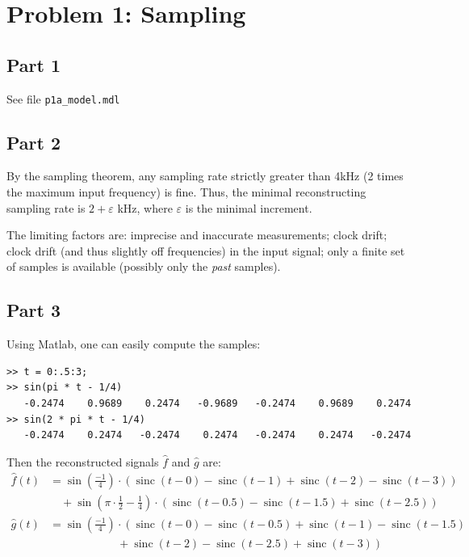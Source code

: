 \documentclass[a4paper,parskip,headheight=38pt]{scrartcl} %
\DeclareMathOperator{\sinc}{sinc}
\begin{document}
\section*{Problem 1: Sampling}

\subsection*{Part 1}

See file \texttt{p1a\_model.mdl}

\subsection*{Part 2}

By the sampling theorem, any sampling rate strictly greater than 4kHz
(2 times the maximum input frequency) is fine.  Thus, the minimal
reconstructing sampling rate is $2 + \varepsilon$ kHz, where
$\varepsilon$ is the minimal increment.

The limiting factors are: imprecise and inaccurate measurements; clock
drift; clock drift (and thus slightly off frequencies) in the input
signal; only a finite set of samples is available (possibly only the
\emph{past} samples).

\subsection*{Part 3}

Using Matlab, one can easily compute the samples:
\begin{verbatim}
>> t = 0:.5:3;
>> sin(pi * t - 1/4)
   -0.2474    0.9689    0.2474   -0.9689   -0.2474    0.9689    0.2474
>> sin(2 * pi * t - 1/4)
   -0.2474    0.2474   -0.2474    0.2474   -0.2474    0.2474   -0.2474
\end{verbatim}

Then the reconstructed signals $\hat{f}$ and $\hat{g}$ are:
\begin{align*}
    \hat{f}(t) &= \sin(\frac{-1}{4}) \cdot \left(\sinc(t -0) - \sinc(t - 1) + \sinc(t-2) - \sinc(t - 3) \right) \\
    &\quad + \sin(\pi \cdot \frac{1}{2} - \frac{1}{4}) \cdot \left( \sinc(t - 0.5) - \sinc(t - 1.5) + \sinc(t - 2.5) \right) \\
    \hat{g}(t) &= \sin(\frac{-1}{4}) \cdot \left(\sinc(t -0) - \sinc(t - 0.5) + \sinc(t - 1) - \sinc(t - 1.5) \right. \\
    &\qquad\qquad\qquad + \left. \sinc(t-2) - \sinc(t-2.5) + \sinc(t - 3) \right)
\end{align*}
\end{document}
